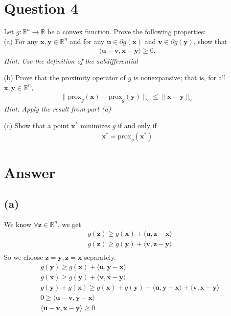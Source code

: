 \documentclass{article}
\newcommand{\R}{\mathbb{R}}
\begin{document}
\section*{Question 4}
Let \(g: \R^n \to \R\) be a convex function. Prove the following properties: \\
(a) For any \(\bm{x}, \bm{y} \in \R^n\) and for any \(\bm{u} \in \partial g(\bm{x})\) and \(\bm{v} \in \partial g(\bm{y})\), show that
\begin{align*}
    \langle \bm{u} - \bm{v}, \bm{x} - \bm{y}\rangle \geq 0.
\end{align*}
\textit{Hint: Use the definition of the subdifferential}

\noindent
(b) Prove that the proximity operator of \(g\) is nonexpansive; that is, for all \(\bm{x}, \bm{y} \in \R^n\),
\begin{align*}
    \|\text{prox}_g (\bm{x}) - \text{prox}_g(\bm{y})\|_2 \leq \|\bm{x} - \bm{y}\|_2
\end{align*}
\textit{Hint: Apply the result from part (a)}

\noindent
(c) Show that a point \(\bm{x}^*\) minimizes \(g\) if and only if
\begin{align*}
    \bm{x}^* = \text{prox}_g(\bm{x}^*)
\end{align*}

\section*{Answer}
\subsection*{(a)}
We know \(\forall \bm{z} \in \R^n\), we get
\begin{align*}
    &g(\bm{z}) \geq g(\bm{x}) + \langle \bm{u}, \bm{z} - \bm{x}\rangle \\
    &g(\bm{z}) \geq g(\bm{y}) + \langle \bm{v}, \bm{z} - \bm{y}\rangle \\
\end{align*}
So we choose \(\bm{z} = \bm{y}, \bm{z} = \bm{x}\) separately.
\begin{align*}
    &g(\bm{y}) \geq g(\bm{x}) + \langle \bm{u}, \bm{y} - \bm{x}\rangle \\
    &g(\bm{x}) \geq g(\bm{y}) + \langle \bm{v}, \bm{x} - \bm{y}\rangle \\
    &g(\bm{y}) + g(\bm{x}) \geq g(\bm{x}) + g(\bm{y}) + \langle \bm{u}, \bm{y} - \bm{x}\rangle + \langle \bm{v}, \bm{x} - \bm{y}\rangle \\
    &0 \geq \langle \bm{u} - \bm{v}, \bm{y} - \bm{x}\rangle \\
    &\langle \bm{u} - \bm{v}, \bm{x} - \bm{y}\rangle \geq 0
\end{align*}
\end{document}

